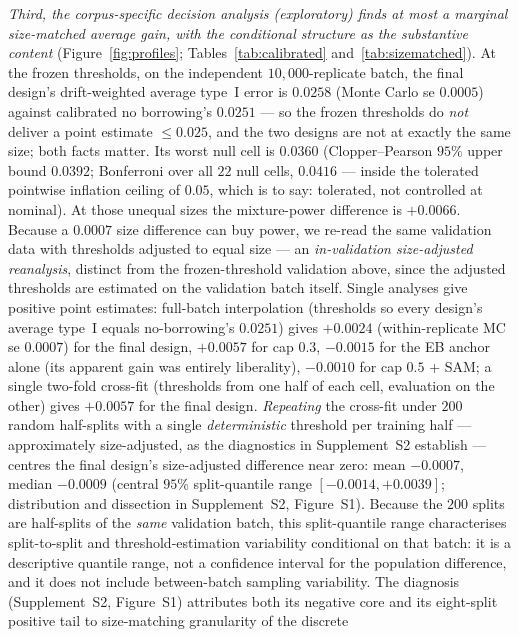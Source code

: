 \documentclass[11pt]{article}
\begin{document}
\emph{Third, the corpus-specific decision analysis (exploratory) finds at
most a marginal size-matched average gain, with the conditional structure
as the substantive content} (Figure~\ref{fig:profiles};
Tables~\ref{tab:calibrated} and~\ref{tab:sizematched}). At the frozen
thresholds, on the independent $10{,}000$-replicate batch, the final
design's drift-weighted average type~I error is $0.0258$ (Monte Carlo se
$0.0005$) against calibrated no borrowing's $0.0251$ --- so the frozen
thresholds do \emph{not} deliver a point estimate $\le 0.025$, and the two
designs are not at exactly the same size; both facts matter. Its worst
null cell is $0.0360$ (Clopper--Pearson $95\%$ upper bound $0.0392$;
Bonferroni over all $22$ null cells, $0.0416$ --- inside the tolerated
pointwise inflation ceiling of $0.05$, which is to say: tolerated, not
controlled at nominal). At those unequal sizes the mixture-power
difference is $+0.0066$. Because a $0.0007$ size difference can buy power,
we re-read the same validation data with thresholds adjusted to equal
size --- an \emph{in-validation size-adjusted reanalysis}, distinct from
the frozen-threshold validation above, since the adjusted thresholds are
estimated on the validation batch itself. Single analyses give positive
point estimates: full-batch interpolation (thresholds so every design's
average type~I equals no-borrowing's $0.0251$) gives $+0.0024$
(within-replicate MC se $0.0007$) for the final design, $+0.0057$ for cap
$0.3$, $-0.0015$ for the EB anchor alone (its apparent gain was entirely
liberality), $-0.0010$ for cap $0.5$ + SAM; a single two-fold cross-fit
(thresholds from one half of each cell, evaluation on the other) gives
$+0.0057$ for the final design. \emph{Repeating} the cross-fit under
$200$ random half-splits with a single \emph{deterministic} threshold
per training half --- approximately size-adjusted, as the diagnostics
in Supplement~S2 establish --- centres the final
design's size-adjusted difference near zero: mean $-0.0007$, median
$-0.0009$ (central $95\%$ split-quantile range
$[-0.0014, +0.0039]$; distribution and dissection in Supplement~S2,
Figure~S1). Because the $200$
splits are half-splits of the \emph{same} validation batch, this
split-quantile range characterises split-to-split and
threshold-estimation
variability conditional on that batch: it is a descriptive quantile
range, not a confidence interval for the population difference, and it
does not include between-batch sampling variability. The diagnosis
(Supplement~S2, Figure~S1) attributes both its negative core and its
eight-split positive tail to size-matching granularity of the discrete
\end{document}
